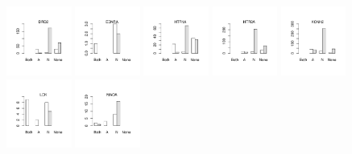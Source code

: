 \documentclass[utf8]{frontiersSCNS} %
\begin{document}
\begin{figure}[h!]
\includegraphics[width=0.19\textwidth]{figures/validation_plots/drd2_0p9_valplot.pdf}
\includegraphics[width=0.19\textwidth]{figures/validation_plots/ednra_0p9_valplot.pdf}
\vspace*{-15pt} %
\includegraphics[width=0.19\textwidth]{figures/validation_plots/htr1a_0p9_valplot.pdf}
\includegraphics[width=0.19\textwidth]{figures/validation_plots/htr2a_0p9_valplot.pdf}
\includegraphics[width=0.19\textwidth]{figures/validation_plots/kcnh2_0p9_valplot.pdf}
\includegraphics[width=0.19\textwidth]{figures/validation_plots/lck_0p9_valplot.pdf}
\includegraphics[width=0.19\textwidth]{figures/validation_plots/maoa_0p9_valplot.pdf}

\end{figure}
\end{document}
